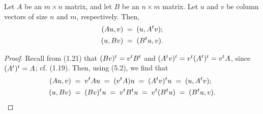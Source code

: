 \begin{lemma}
Let $A$ be an $m \times n$ matrix, and let $B$ be an $n \times m$ matrix. Let $u$ and
$v$ be column vectors of size $n$ and $m$, respectively. Then,
\begin{align}
(Au,v) &\;=\; (u,A^{t} v);\\
(u,Bv) &\;=\; (B^{t} u,v).
\end{align}
\end{lemma}

\begin{proof}
Recall from (1.21) that $(Bv)^{t} = v^{t} B^{t}$ and $(A^{t} v)^{t} = v^{t}(A^{t})^{t} = v^{t} A$,
since $(A^{t})^{t} = A$; cf. (1.19). Then, using (5.2), we find that
\begin{align*}
(Au,v) &\;=\; v^{t} Au \;=\; (v^{t} A)u \;=\; (A^{t} v)^{t} u \;=\; (u,A^{t} v);\\
(u,Bv) &\;=\; (Bv)^{t} u \;=\; v^{t} B^{t} u \;=\; v^{t}(B^{t} u) \;=\; (B^{t} u,v).
\end{align*}
\end{proof}
